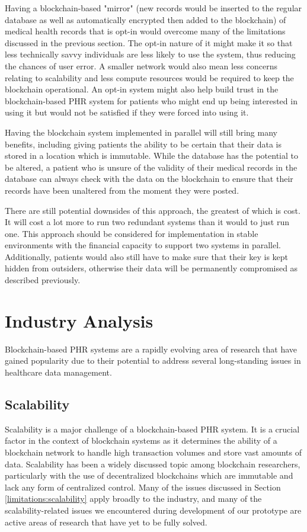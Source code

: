 \documentclass{article}
\begin{document}
Having a blockchain-based "mirror" (new records would be inserted to the regular database as well as automatically encrypted then added to the blockchain) of medical health records that is opt-in would overcome many of the limitations discussed in the previous section. The opt-in nature of it might make it so that less technically savvy individuals are less likely to use the system, thus reducing the chances of user error. A smaller network would also mean less concerns relating to scalability and less compute resources would be required to keep the blockchain operational. An opt-in system might also help build trust in the blockchain-based PHR system for patients who might end up being interested in using it but would not be satisfied if they were forced into using it.

Having the blockchain system implemented in parallel will still bring many benefits, including giving patients the ability to be certain that their data is stored in a location which is immutable. While the database has the potential to be altered, a patient who is unsure of the validity of their medical records in the database can always check with the data on the blockchain to ensure that their records have been unaltered from the moment they were posted. 

There are still potential downsides of this approach, the greatest of which is cost. It will cost a lot more to run two redundant systems than it would to just run one. This approach should be considered for implementation in stable environments with the financial capacity to support two systems in parallel. Additionally, patients would also still have to make sure that their key is kept hidden from outsiders, otherwise their data will be permanently compromised as described previously.

\section{Industry Analysis}
Blockchain-based PHR systems are a rapidly evolving area of research that have gained popularity due to their potential to address several long-standing issues in healthcare data management.

\subsection{Scalability}
\label{industryanalysis:scalability}
Scalability is a major challenge of a blockchain-based PHR system. It is a crucial factor in the context of blockchain systems as it determines the ability of a blockchain network to handle high transaction volumes and store vast amounts of data. Scalability has been a widely discussed topic among blockchain researchers, particularly with the use of decentralized blockchains which are immutable and lack any form of centralized control. Many of the issues discussed in Section \ref{limitations:scalability} apply broadly to the industry, and many of the scalability-related issues we encountered during development of our prototype are active areas of research that have yet to be fully solved.
\end{document}
